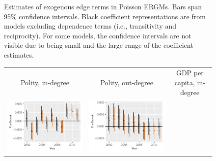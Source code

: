 \documentclass[reqno,onecolumn,letterpaper,12pt]{article}
\begin{document}
\begin{figure}[!h]
\begin{tabular}{@{\hskip -.05cm}c@{\hskip -.2cm}c@{\hskip -.2cm}c}
\end{tabular}
\caption{\label{fig:edge_controls} Estimates of exogenous edge terms in Poisson ERGMs. Bars span 95\% confidence intervals. Black coefficient representations are from models excluding dependence terms (i.e., transitivity and reciprocity). For some models, the confidence intervals are not visible due to being small and the large range of the coefficient estimates.}
\end{figure}

\begin{figure}[!h]
\centering
\begin{tabular}{@{\hskip -.05cm}c@{\hskip -.2cm}c@{\hskip -.2cm}c}
Polity, in-degree &
Polity, out-degree &
GDP per capita, in-degree \\
\includegraphics[height=.165\textheight, clip=true, trim=.5cm .5cm 0cm .1cm]{figures/main_rl_plots/Dest_Polity.pdf} &
\includegraphics[height=.165\textheight, clip=true, trim=.5cm .5cm 0cm .1cm]{figures/main_rl_plots/Origin_Polity.pdf}  &

\end{tabular}
\end{figure}
\end{document}
